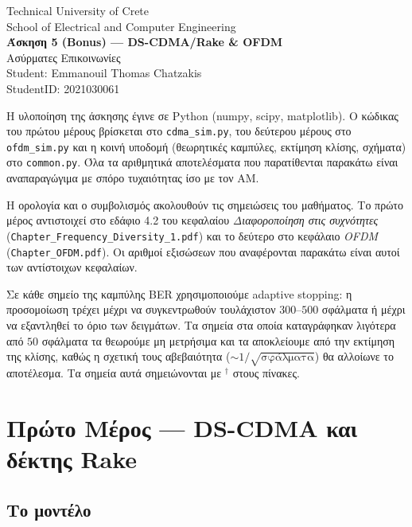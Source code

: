 \documentclass[11pt,a4paper]{article}
\newcommand{\en}[1]{\textenglish{#1}}
\newcommand{\BER}{\en{BER}}
\newcommand{\Rake}{\en{Rake}}
\begin{document}
\begin{center}
  {\large\en{Technical University of Crete}}\\[2pt]
  {\large\en{School of Electrical and Computer Engineering}}\\[14pt]
  {\LARGE\bfseries Άσκηση 5 (\en{Bonus}) — \en{DS-CDMA/Rake} \& \en{OFDM}}\\[8pt]
  {\large Ασύρματες Επικοινωνίες}\\[14pt]
  \en{Student: Emmanouil Thomas Chatzakis}\\
  \en{StudentID: 2021030061}
\end{center}

\vspace{6pt}

Η υλοποίηση της άσκησης έγινε σε \en{Python} (\en{numpy}, \en{scipy}, \en{matplotlib}).
Ο κώδικας του πρώτου μέρους βρίσκεται στο \en{\texttt{cdma\_sim.py}}, του δεύτερου μέρους
στο \en{\texttt{ofdm\_sim.py}} και η κοινή υποδομή (θεωρητικές καμπύλες, εκτίμηση κλίσης,
σχήματα) στο \en{\texttt{common.py}}. Όλα τα αριθμητικά αποτελέσματα που παρατίθενται
παρακάτω είναι αναπαραγώγιμα με σπόρο τυχαιότητας ίσο με τον ΑΜ.

Η ορολογία και ο συμβολισμός ακολουθούν τις σημειώσεις του μαθήματος. Το πρώτο μέρος
αντιστοιχεί στο εδάφιο 4.2 του κεφαλαίου \emph{Διαφοροποίηση στις συχνότητες}
(\en{\texttt{Chapter\_Frequency\_\allowbreak Diversity\_1.pdf}}) και το δεύτερο στο κεφάλαιο
\en{\emph{OFDM}} (\en{\texttt{Chapter\_OFDM.pdf}}). Οι αριθμοί εξισώσεων που αναφέρονται
παρακάτω είναι αυτοί των αντίστοιχων κεφαλαίων.

Σε κάθε σημείο της καμπύλης \BER{} χρησιμοποιούμε \en{adaptive stopping}: η προσομοίωση
τρέχει μέχρι να συγκεντρωθούν τουλάχιστον $300$–$500$ σφάλματα ή μέχρι να εξαντληθεί το όριο
των δειγμάτων. Τα σημεία στα οποία καταγράφηκαν λιγότερα από $50$ σφάλματα τα θεωρούμε μη
μετρήσιμα και τα αποκλείουμε από την εκτίμηση της κλίσης, καθώς η σχετική τους αβεβαιότητα
($\sim 1/\sqrt{\text{σφάλματα}}$) θα αλλοίωνε το αποτέλεσμα. Τα σημεία αυτά σημειώνονται με
$^{\dagger}$ στους πίνακες.

\section{Πρώτο Μέρος — \en{DS-CDMA} και δέκτης \Rake{}}

\subsection*{Το μοντέλο}
\end{document}
